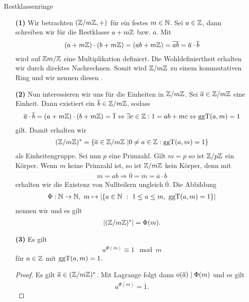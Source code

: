 \begin{genericdf}{Restklassenringe}\label{skript:7.6}\
	\begin{enumerate}
		\item[\textbf{(1)}]
		Wir betrachten $(\mathbb{Z}  / m \mathbb{Z}, + ) $ für ein festes $m \in \mathbb{N}$.
		Sei $a \in \mathbb{Z}$, dann schreiben wir für die Restklasse $a + m \mathbb{Z}$ bzw. $\overline{a}$.
		Mit 
		\begin{align*}
		(a + m \mathbb{Z}) \cdot (b + m \mathbb{Z} ) = (ab + m \mathbb{Z}) = \overline{ab} = \overline{a} \cdot \overline{b}
		\end{align*}
		wird auf $\mathbb{Z} m / \mathbb{Z}$ eine Multiplikation definiert.
		Die Wohldefiniertheit erhalten wir durch direktes Nachrechnen.
		Somit wird $\mathbb{Z} / m \mathbb{Z}$ zu einem kommutativen Ring und wir nennen diesen
		\bi{Restklassenring modulo $m$}.
		
		\item[\textbf{(2)}]
		Nun interessieren wir uns für die Einheiten in $\mathbb{Z} / m \mathbb{Z}$.
		Sei $\overline{a} \in \mathbb{Z} / m \mathbb{Z}$ eine Einheit.
		Dann existiert ein $\overline{b } \in \mathbb{Z} / m \mathbb{Z}$, sodass
		\begin{align*}
		\overline{a} \cdot \overline{b} = (a + m \mathbb{Z}) \cdot (b + m \mathbb{Z}) = \overline{1}
		\Leftrightarrow
		\exists c \in \mathbb{Z} : 1 = ab + mc
		\Leftrightarrow
		\operatorname{ggT}(a,m) = 1
		\end{align*}
		gilt. Damit erhalten wir
		\begin{align*}
		(\mathbb{Z} / m \mathbb{Z})^\ast = \lbrace \overline{a} \in \mathbb{Z} / m \mathbb{Z} \ | 0 \neq a \in \mathbb{Z} : \operatorname{ggT}(a,m)  = 1 \rbrace
		\end{align*}
		als Einheitengruppe.
		Sei nun $p$ eine Primzahl. Gilt $m = p $ so ist $\mathbb{Z} / p \mathbb{Z}$ ein Körper.
		Wenn $m$ keine Primzahl ist, so ist $\mathbb{Z} / m \mathbb{Z}$ kein Körper, denn mit
		\begin{align*}
		m = ab 
		\Rightarrow 
		\overline{0} = \overline{m} = \overline{a} \cdot \overline{b}
		\end{align*}
		erhalten wir die Existenz von Nullteilern ungleich $\overline{0}$.
		Die Abbildung
		\begin{align*}
		\Phi : \mathbb{N} \to \mathbb{N}, \ m \mapsto | \lbrace a \in \mathbb{N} \ : \ 1 \leq a \leq m, \ \operatorname{ggT}(a,m) = 1 \rbrace | 
		\end{align*}
		nennen wir   und es gilt
		\begin{align*}
		| ( \mathbb{Z} / m\mathbb{Z})^\ast | = \Phi(m). 
		\end{align*}
		
		\item[\textbf{(3)}]
		Es gilt
		\begin{align*}
		a^{\Phi(m)} \equiv 1 \mod m
		\end{align*}
		für $a \in \mathbb{Z}$ mit $\operatorname{ggT}(a,m)=1$.
		\begin{proof}
			Es gilt $\overline{a} \in ( \mathbb{Z} / m \mathbb{Z} )^\ast$.
			Mit Lagrange folgt dann $\operatorname{o}(\overline{a}) \mid \Phi(m)$ und es gilt
			\begin{align*}
			\overline{a^{\Phi(m)}} = \overline{1}.
			\end{align*}
		\end{proof}
		

\end{enumerate}
\end{genericdf}
